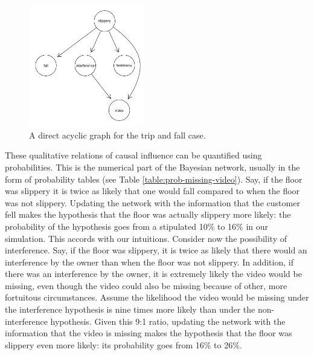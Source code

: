 \documentclass[
  10pt,
  dvipsnames,enabledeprecatedfontcommands]{scrartcl}
\begin{document}
\begin{figure}[t]
\includegraphics[width=5cm]{slippery-dag.png}
\caption{A direct acyclic graph for the trip and fall case.}
\label{fig:dag-missing-video}
\end{figure}

These qualitative relations of causal influence can be quantified using
probabilities. This is the numerical part of the Bayesian network,
usually in the form of probability tables (see Table
\ref{table:prob-missing-video}). Say, if the floor was slippery it is
twice as likely that one would fall compared to when the floor was not
slippery. Updating the network with the information that the customer
fell makes the hypothesis that the floor was actually slippery more
likely: the probability of the hypothesis goes from a stipulated 10\% to
16\% in our simulation. This accords with our intuitions. Consider now
the possibility of interference. Say, if the floor was slippery, it is
twice as likely that there would an interference by the owner than when
the floor was not slippery. In addition, if there was an interference by
the owner, it is extremely likely the video would be missing, even
though the video could also be missing because of other, more fortuitous
circumstances. Assume the likelihood the video would be missing under
the interference hypothesis is nine times more likely than under the
non-interference hypothesis. Given this 9:1 ratio, updating the network
with the information that the video is missing makes the hypothesis that
the floor was slippery even more likely: its probability goes from 16\%
to 26\%.
\end{document}

